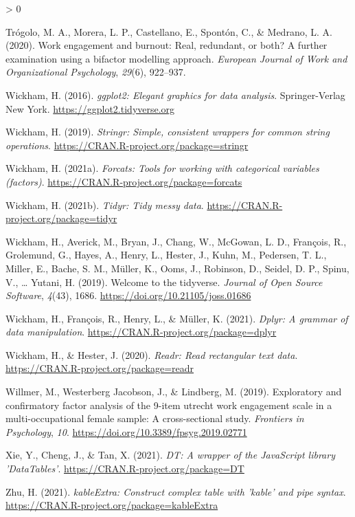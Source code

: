 \documentclass[
  english,
  man]{apa7}
\newlength{\cslhangindent}
\newenvironment{CSLReferences}[2] %
 {%
  \setlength{\parindent}{0pt}
  \ifodd #1 \everypar{\setlength{\hangindent}{\cslhangindent}}\ignorespaces\fi
  \ifnum #2 > 0
  \setlength{\parskip}{#2\baselineskip}
  \fi
 }%
 {}
\begin{document}
\begin{CSLReferences}{1}{0}
\leavevmode\hypertarget{ref-trogolo2020work}{}%
Trógolo, M. A., Morera, L. P., Castellano, E., Spontón, C., \& Medrano, L. A. (2020). Work engagement and burnout: Real, redundant, or both? A further examination using a bifactor modelling approach. \emph{European Journal of Work and Organizational Psychology}, \emph{29}(6), 922--937.

\leavevmode\hypertarget{ref-R-ggplot2}{}%
Wickham, H. (2016). \emph{ggplot2: Elegant graphics for data analysis}. Springer-Verlag New York. \url{https://ggplot2.tidyverse.org}

\leavevmode\hypertarget{ref-R-stringr}{}%
Wickham, H. (2019). \emph{Stringr: Simple, consistent wrappers for common string operations}. \url{https://CRAN.R-project.org/package=stringr}

\leavevmode\hypertarget{ref-R-forcats}{}%
Wickham, H. (2021a). \emph{Forcats: Tools for working with categorical variables (factors)}. \url{https://CRAN.R-project.org/package=forcats}

\leavevmode\hypertarget{ref-R-tidyr}{}%
Wickham, H. (2021b). \emph{Tidyr: Tidy messy data}. \url{https://CRAN.R-project.org/package=tidyr}

\leavevmode\hypertarget{ref-R-tidyverse}{}%
Wickham, H., Averick, M., Bryan, J., Chang, W., McGowan, L. D., François, R., Grolemund, G., Hayes, A., Henry, L., Hester, J., Kuhn, M., Pedersen, T. L., Miller, E., Bache, S. M., Müller, K., Ooms, J., Robinson, D., Seidel, D. P., Spinu, V., \ldots{} Yutani, H. (2019). Welcome to the {tidyverse}. \emph{Journal of Open Source Software}, \emph{4}(43), 1686. \url{https://doi.org/10.21105/joss.01686}

\leavevmode\hypertarget{ref-R-dplyr}{}%
Wickham, H., François, R., Henry, L., \& Müller, K. (2021). \emph{Dplyr: A grammar of data manipulation}. \url{https://CRAN.R-project.org/package=dplyr}

\leavevmode\hypertarget{ref-R-readr}{}%
Wickham, H., \& Hester, J. (2020). \emph{Readr: Read rectangular text data}. \url{https://CRAN.R-project.org/package=readr}

\leavevmode\hypertarget{ref-willmer_exploratory_2019}{}%
Willmer, M., Westerberg Jacobson, J., \& Lindberg, M. (2019). Exploratory and confirmatory factor analysis of the 9-item utrecht work engagement scale in a multi-occupational female sample: A cross-sectional study. \emph{Frontiers in Psychology}, \emph{10}. \url{https://doi.org/10.3389/fpsyg.2019.02771}

\leavevmode\hypertarget{ref-R-DT}{}%
Xie, Y., Cheng, J., \& Tan, X. (2021). \emph{DT: A wrapper of the JavaScript library 'DataTables'}. \url{https://CRAN.R-project.org/package=DT}

\leavevmode\hypertarget{ref-R-kableExtra}{}%
Zhu, H. (2021). \emph{kableExtra: Construct complex table with 'kable' and pipe syntax}. \url{https://CRAN.R-project.org/package=kableExtra}

\end{CSLReferences}

\endgroup
\end{document}

